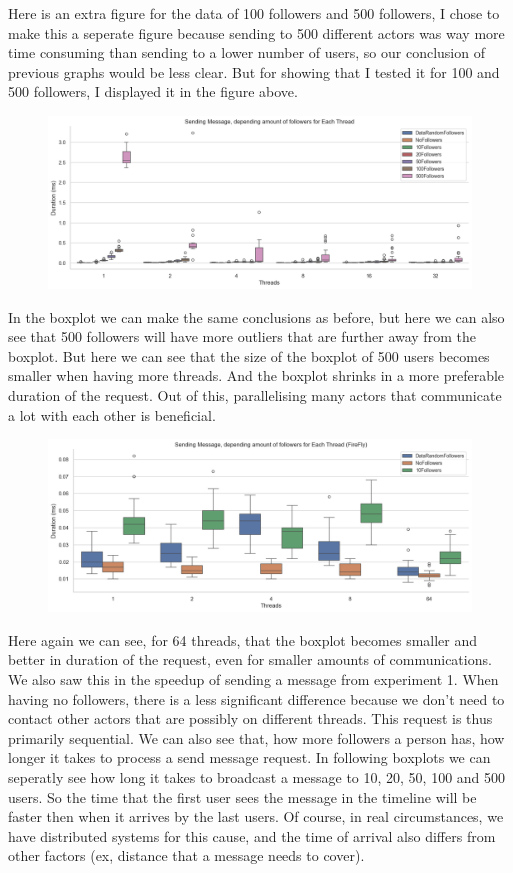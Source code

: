 \documentclass[a4paper]{article}
\begin{document}
Here is an extra figure for the data of 100 followers and 500 followers, I chose to make this a seperate figure because sending to 500 different actors was way more time consuming than sending to a lower number of users, so our conclusion of previous graphs would be less clear. But for showing that I tested it for 100 and 500 followers, I displayed it in the figure above. 

\begin{figure}[H]
	\centering
	\includegraphics[width = \linewidth]{Images/SendingMessageLatencyBox.png}
	\caption{}
\end{figure}
In the boxplot we can make the same conclusions as before, but here we can also see that 500 followers will have more outliers that are further away from the boxplot. But here we can see that the size of the boxplot of 500 users becomes smaller when having more threads. And the boxplot shrinks in a more preferable duration of the request. Out of this, parallelising many actors that communicate a lot with each other is beneficial. 
\begin{figure}[H]
	\centering
	\includegraphics[width = \linewidth]{Images/SendingMessageLatencyBoxFireFly.png}
	\caption{}
\end{figure}
Here again we can see, for 64 threads, that the boxplot becomes smaller and better in duration of the request, even for smaller amounts of communications. We also saw this in the speedup of sending a message from experiment 1. When having no followers, there is a less significant difference because we don't need to contact other actors that are possibly on different threads. This request is thus primarily sequential. We can also see that, how more followers a person has, how longer it takes to process a send message request. In following boxplots we can seperatly see how long it takes to broadcast a message to 10, 20, 50, 100 and 500 users. So the time that the first user sees the message in the timeline will be faster then when it arrives by the last users. Of course, in real circumstances, we have distributed systems for this cause, and the time of arrival also differs from other factors (ex, distance that a message needs to cover).  
\end{document}
